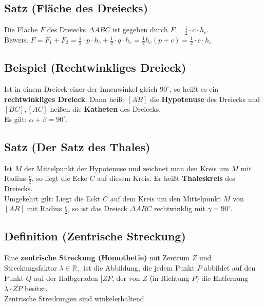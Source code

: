 	
\subsection[Die Fläche des Dreiecks]{Satz (Fläche des Dreiecks)}

	Die Fläche $F$ des Dreiecks $\Delta ABC$ ist gegeben durch $F=\frac{1}{2}\cdot c \cdot h_c$.\\
	\newline
	\textsc{Beweis.} $F=F_1+F_2=\frac{1}{2}\cdot p \cdot h_c + \frac{1}{2}\cdot q \cdot h_c =
	\frac{1}{2}h_c(p+c)=\frac{1}{2}\cdot c\cdot h_c$
	
	
\subsection[Das rechtwinklige Dreieck]{Beispiel (Rechtwinkliges Dreieck)}

	Ist in einem Dreieck einer der Innenwinkel gleich $90^{\circ}$, so heißt es ein 
	\textbf{rechtwinkliges Dreieck}. Dann heißt $[AB]$ die \textbf{Hypotenuse} des Dreiecks und $[BC],[AC]$ heißen 
	die \textbf{Katheten} des Dreiecks.\\
	Es gilt: $\alpha+\beta=90^{\circ}$.
	
	
\subsection[Der Satz des Thales]{Satz (Der Satz des Thales)}

	Ist $M$ der Mittelpunkt der Hypotenuse und zeichnet man den Kreis um $M$ mit Radius $\frac{c}{2}$, so liegt
	die Ecke $C$ auf diesem Kreis. Er heißt \textbf{Thaleskreis} des Dreiecks.\\
	\newline
	Umgekehrt gilt: Liegt die Eckt $C$ auf dem Kreis um den Mittelpunkt $M$ von $[AB]$ mit Radius $\frac{c}{2}$,
	so ist das Dreieck $\Delta ABC$ rechtwinklig mit $\gamma=90^{\circ}$.
	
	
\subsection[Die zentrische Streckung]{Definition (Zentrische Streckung)}	
	
	Eine \textbf{zentrische Streckung (Homothetie)} mit Zentrum $Z$ und Streckungsfaktor $\lambda\in\mathbb{R}_+$
	ist die Abbildung, die jedem Punkt $P$ abbildet auf den Punkt $Q$ auf der Halbgeraden $[ZP$, der von $Z$ (in
	Richtung $P$) die Entfernung $\lambda\cdot \overline{ZP}$ besitzt. \\
	\newline
	Zentrische Streckungen sind winkelerhaltend.
	
